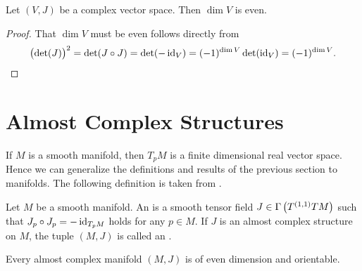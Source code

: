 \begin{lemma}
Let $(V,J)$ be a complex vector space. Then $\dim V$ is even.
\label{lem:complex_vec}
\end{lemma}

\begin{proof}
That $\dim V$ must be even follows directly from
\begin{equation*}
\del[1]{\det(J)}^2 = \det(J \circ J) = \det(-\id_V) = (-1)^{\dim V} \det(\id_V) = (-1)^{\dim V}.
\end{equation*} 
\end{proof}

\section{Almost Complex Structures}
If $M$ is a smooth manifold, then $T_pM$ is a finite dimensional real vector space. Hence we can generalize the definitions and results of the previous section to manifolds. The following definition is taken from \cite[86]{cannas:symplectic_geometry:2008}.
\begin{definition}
Let $M$ be a smooth manifold. An  is a smooth tensor field $J \in \Gamma\del[1]{T^{(1,1)}TM}$ such that $J_p \circ J_p = -\operatorname{id}_{T_pM}$ holds for any $p \in M$. If $J$ is an almost complex structure on $M$, the tuple $(M,J)$ is called an .
\end{definition}

\begin{proposition}
Every almost complex manifold $(M,J)$ is of even dimension and orientable.
\label{prop:almost_comp}
\end{proposition}

